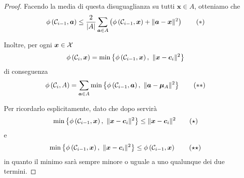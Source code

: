\begin{proof}
    Facendo la media di questa disuguaglianza su tutti $\bm x \in A$, otteniamo che
    \[ \phi \left(\mathcal{C}_{i-1}, \bm a\right) \leq \frac{2}{|A|} \sum_{\bm a \in A} \left(\phi \left(\mathcal{C}_{i-1}, \bm x\right) + \| \bm a - \bm x \|^2 \right) \tag*{$(\ast)$}\]

    Inoltre, per ogni $\bm x \in \mathcal{X}$
    \[ \phi \left(\mathcal{C}_i, \bm x\right) = \min \left\{\phi \left(\mathcal{C}_{i-1}, \bm x\right), \ \| \bm x - \bm c_i \|^2 \right\} \]
	di conseguenza
	\[ \phi \left(\mathcal{C}_i, A \right) = \sum_{\bm a \in A} \min \left\{ \phi \left(\mathcal{C}_{i-1}, \bm a\right), \ \| \bm a - \bm \mu_A \|^2 \right\} \tag*{$(\ast \ast)$} \]

    Per ricordarlo esplicitamente, dato che dopo servirà
    \[\min \left\{\phi \left(\C_{i-1}, \bm x\right), \ \| \bm x - \bm c_i \|^2 \right\} \leq \|\bm x - \bm c_i \|^2 \tag*{$(\star)$}\]
    e
    \[\min \left\{\phi \left(\mathcal{C}_{i-1}, \bm x\right), \ \| \bm x - \bm c_i \|^2 \right\} \leq \phi \left(\mathcal{C}_{i-1}, \bm x\right) \tag*{$(\star \star)$}\]
    in quanto il minimo sarà sempre minore o uguale a uno qualunque dei due termini.


\end{proof}
